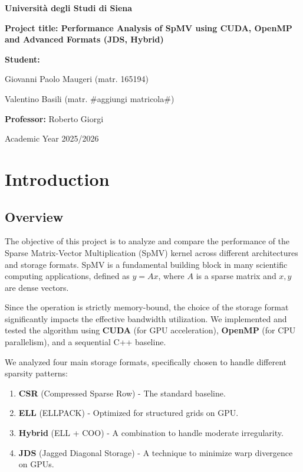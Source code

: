 \documentclass[a4paper,12pt]{article}
\begin{document}
\begin{titlepage}
    \centering
    \vspace*{1cm}
    
    {\LARGE \textbf{Università degli Studi di Siena} \par}
    \vspace{1.5cm}
    
    {\Large \textbf{Project title: Performance Analysis of SpMV using CUDA, OpenMP and Advanced Formats (JDS, Hybrid)} \par}
    \vspace{1.5cm}
    {\large \textbf{Student:}}
    {\large Giovanni Paolo Maugeri (matr. 165194) \par}
    {\large  Valentino Basili (matr. #aggiungi matricola#) \par}
    \vspace{1cm}
    
    {\large \textbf{Professor:} Roberto Giorgi \par}
    
    \vfill
    
    {\large Academic Year 2025/2026 \par}
\end{titlepage}

\tableofcontents
\newpage


\section{Introduction}
\subsection{Overview}
The objective of this project is to analyze and compare the performance of the Sparse Matrix-Vector Multiplication (SpMV) kernel across different architectures and storage formats. SpMV is a fundamental building block in many scientific computing applications, defined as $y = Ax$, where $A$ is a sparse matrix and $x, y$ are dense vectors.

Since the operation is strictly memory-bound, the choice of the storage format significantly impacts the effective bandwidth utilization. We implemented and tested the algorithm using \textbf{CUDA} (for GPU acceleration), \textbf{OpenMP} (for CPU parallelism), and a sequential C++ baseline. 

We analyzed four main storage formats, specifically chosen to handle different sparsity patterns:
\begin{enumerate}
    \item \textbf{CSR} (Compressed Sparse Row) - The standard baseline.
    \item \textbf{ELL} (ELLPACK) - Optimized for structured grids on GPU.
    \item \textbf{Hybrid} (ELL + COO) - A combination to handle moderate irregularity.
    \item \textbf{JDS} (Jagged Diagonal Storage) - A technique to minimize warp divergence on GPUs.
\end{enumerate}
\end{document}
